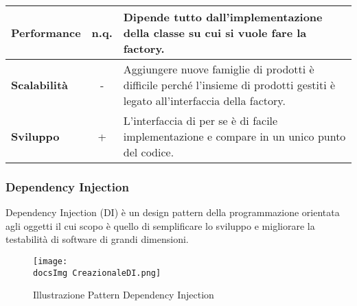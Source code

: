 {{{\begin{itemize}
{\begin{tabular}{|l|c|l|}
						\hline
						\textbf{Performance} & n.q. & Dipende tutto dall'implementazione della classe su cui si vuole fare la factory. \\
						\hline
						\textbf{Scalabilità} & - & Aggiungere nuove famiglie di prodotti è difficile perché l’insieme di prodotti gestiti è legato all'interfaccia della factory. \\
						\hline
						\textbf{Sviluppo} & + & L'interfaccia di per se è di facile implementazione e compare in un unico punto del codice. \\
						\hline
					\end{tabular}
				}
			\end{itemize}
		}
	
		\subsubsection{Dependency Injection}{
			Dependency Injection (DI) è un design pattern della programmazione orientata agli oggetti il cui scopo è quello di semplificare lo sviluppo e migliorare la testabilità di software di grandi dimensioni.
			
			\begin{figure}[ht]
				\centering
				\texttt{[image: \\docsImg CreazionaleDI.png]}
				\caption{Illustrazione Pattern Dependency Injection}
				\label{Illustrazione Pattern Dependency Injection}
			\end{figure}
		
}}}
